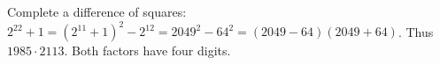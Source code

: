 Complete a difference of squares: $2^{22}+1=(2^{11}+1)^2-2^{12}=2049^2-64^2=(2049-64)(2049+64)$. Thus $\boxed{1985\cdot2113}$. Both factors have four digits.
